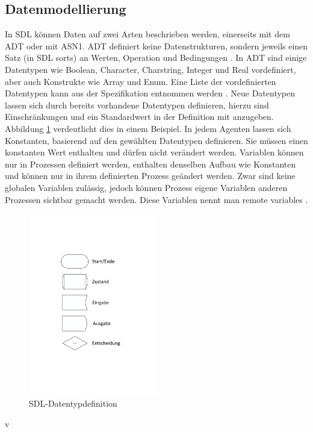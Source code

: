\subsection{Datenmodellierung}
\label{ssc:Daten}
In \ac{SDL} können Daten auf zwei Arten beschrieben werden, einerseits mit dem \acs{ADT} oder mit \ac{ASN1}. \ac{ADT} definiert keine Datenstrukturen, sondern jeweils einen Satz (in \ac{SDL} sorts) an Werten, Operation und Bedingungen \cite[67]{ITUT104_2016}. In \ac{ADT} sind einige Datentypen wie Boolean, Character, Charstring, Integer und Real vordefiniert, aber auch Konstrukte wie Array und Enum. Eine Liste der vordefinierten Datentypen kann aus der Spezifikation entnommen werden \cite[47\psqq]{ITUT104_2016}. Neue Datentypen lassen sich durch bereits vorhandene Datentypen definieren, hierzu sind Einschränkungen und ein Standardwert in der Definition mit anzugeben. Abbildung \ref{fig:DatentypDef} verdeutlicht dies in einem Beispiel. In jedem Agenten lassen sich Konstanten, basierend auf den gewählten Datentypen definieren. Sie müssen einen konstanten Wert enthalten und dürfen nicht verändert werden. Variablen können nur in Prozessen definiert werden, enthalten denselben Aufbau wie Konstanten und können nur in ihrem definierten Prozess geändert werden. Zwar sind keine globalen Variablen zulässig, jedoch können Prozess eigene Variablen anderen Prozessen sichtbar gemacht werden. Diese Variablen nennt man remote variables \cite[31]{ITUT102_2016}.


\begin{figure}[h]
	\centering
	\includegraphics[width=0.5\textwidth]{Graphics/Basiskonstrukte.pdf}
	\caption{SDL-Datentypdefinition}
	\label{fig:DatentypDef}
\end{figure}v


